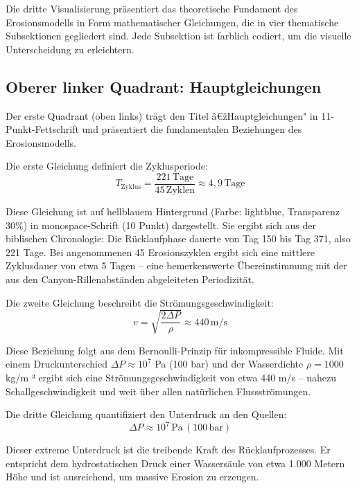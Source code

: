 ﻿\documentclass[12pt,a4paper]{report}
\begin{document}
Die dritte Visualisierung präsentiert das theoretische Fundament des Erosionsmodells in Form mathematischer Gleichungen, die in vier thematische Subsektionen gegliedert sind. Jede Subsektion ist farblich codiert, um die visuelle Unterscheidung zu erleichtern.

\subsection{Oberer linker Quadrant: Hauptgleichungen}

Der erste Quadrant (oben links) trägt den Titel â€žHauptgleichungen" in 11-Punkt-Fettschrift und präsentiert die fundamentalen Beziehungen des Erosionsmodells.

Die erste Gleichung definiert die Zyklusperiode:
\begin{equation*}
	T_{\mathrm{Zyklus}} = \frac{221 \, \mathrm{Tage}}{45 \, \mathrm{Zyklen}} \approx 4{,}9 \, \mathrm{Tage}
\end{equation*}

Diese Gleichung ist auf hellblauem Hintergrund (Farbe: lightblue, Transparenz 30\%) in monospace-Schrift (10 Punkt) dargestellt. Sie ergibt sich aus der biblischen Chronologie: Die Rücklaufphase dauerte von Tag 150 bis Tag 371, also 221 Tage. Bei angenommenen 45 Erosionszyklen ergibt sich eine mittlere Zyklusdauer von etwa 5 Tagen -- eine bemerkenswerte Übereinstimmung mit der aus den Canyon-Rillenabständen abgeleiteten Periodizität.

Die zweite Gleichung beschreibt die Strömungsgeschwindigkeit:
\begin{equation*}
	v = \sqrt{\frac{2 \Delta P}{\rho}} \approx 440 \, \mathrm{m/s}
\end{equation*}

Diese Beziehung folgt aus dem Bernoulli-Prinzip für inkompressible Fluide. Mit einem Druckunterschied $\Delta P \approx 10^7$ Pa (100 bar) und der Wasserdichte $\rho = 1000$ kg/m ³ ergibt sich eine Strömungsgeschwindigkeit von etwa 440 m/s -- nahezu Schallgeschwindigkeit und weit über allen natürlichen Flussströmungen.

Die dritte Gleichung quantifiziert den Unterdruck an den Quellen:
\begin{equation*}
	\Delta P \approx 10^7 \, \mathrm{Pa} \, (100 \, \mathrm{bar})
\end{equation*}

Dieser extreme Unterdruck ist die treibende Kraft des Rücklaufprozesses. Er entspricht dem hydrostatischen Druck einer Wassersäule von etwa 1.000 Metern Höhe und ist ausreichend, um massive Erosion zu erzeugen.
\end{document}
